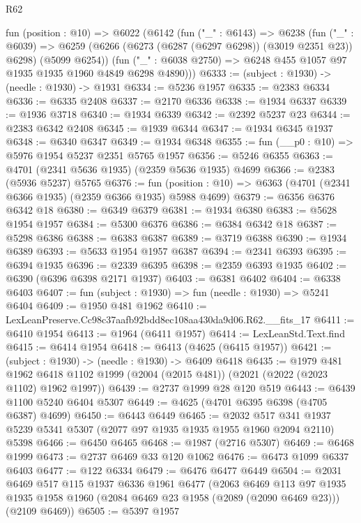 \begin{lexlean}{R62}
\begin{coremodule}
  fun (position : @10) =>
  @6022
    (@6142
      (fun ("_" : @6143) =>
      @6238
        (fun ("_" : @6039) =>
        @6259 (@6266 (@6273 (@6287 (@6297 @6298)) (@3019 @2351 @23)) @6298) (@5099 @6254))
        (fun ("_" : @6038 @2750) => @6248 @455 @1057 @97 @1935 @1935 @1960 @4849 @6298 @4890)))
@6333 := (subject : @1930) -> (needle : @1930) -> @1931
@6334 := @5236 @1957
@6335 := @2383 @6334
@6336 := @6335 @2408
@6337 := @2170 @6336
@6338 := @1934 @6337
@6339 := @1936 @3718
@6340 := @1934 @6339
@6342 := @2392 @5237 @23
@6344 := @2383 @6342 @2408
@6345 := @1939 @6344
@6347 := @1934 @6345 @1937
@6348 := @6340 @6347
@6349 := @1934 @6348
@6355 := fun (__p0 : @10) => @5976 @1954 @5237 @2351 @5765 @1957
@6356 := @5246 @6355
@6363 := @4701 (@2341 @5636 @1935) (@2359 @5636 @1935) @4699
@6366 := @2383 (@5936 @5237) @5765
@6376 := fun (position : @10) => @6363 (@4701 (@2341 @6366 @1935) (@2359 @6366 @1935) @5988 @4699)
@6379 := @6356 @6376 @6342 @18
@6380 := @6349 @6379
@6381 := @1934 @6380
@6383 := @5628 @1954 @1957
@6384 := @5300 @6376
@6386 := @6384 @6342 @18
@6387 := @5298 @6386
@6388 := @6383 @6387
@6389 := @3719 @6388
@6390 := @1934 @6389
@6393 := @5633 @1954 @1957 @6387
@6394 := @2341 @6393
@6395 := @6394 @1935
@6396 := @2339 @6395
@6398 := @2359 @6393 @1935
@6402 := @6390 (@6396 @6398 @2171 @1937)
@6403 := @6381 @6402
@6404 := @6338 @6403
@6407 := fun (subject : @1930) => fun (needle : @1930) => @5241 @6404
@6409 := @1950 @481 @1962
@6410 := LexLeanPreserve.Cc98c37aafb92bdd8ec108aa430da9d06.R62.__fits_17
@6411 := @6410 @1954
@6413 := @1964 (@6411 @1957)
@6414 := LexLeanStd.Text.find
@6415 := @6414 @1954
@6418 := @6413 (@4625 (@6415 @1957))
@6421 := (subject : @1930) -> (needle : @1930) -> @6409 @6418
@6435 := @1979
    @481
    @1962
    @6418
    @1102
    @1999
    (@2004 (@2015 @481))
    (@2021 (@2022 (@2023 @1102) @1962 @1997))
@6439 := @2737 @1999 @28 @120 @519
@6443 := @6439 @1100 @5240 @6404 @5307
@6449 := @4625 (@4701 @6395 @6398 (@4705 @6387) @4699)
@6450 := @6443 @6449
@6465 := @2032
    @517
    @341
    @1937
    @5239
    @5341
    @5307
    (@2077 @97 @1935 @1935 @1955 @1960 @2094 @2110)
    @5398
@6466 := @6450 @6465
@6468 := @1987 (@2716 @5307)
@6469 := @6468 @1999
@6473 := @2737 @6469 @33 @120 @1062
@6476 := @6473 @1099 @6337 @6403
@6477 := @122 @6334
@6479 := @6476 @6477 @6449
@6504 := @2031
    @6469
    @517
    @115
    @1937
    @6336
    @1961
    @6477
    (@2063
      @6469
      @113
      @97
      @1935
      @1935
      @1958
      @1960
      (@2084 @6469 @23 @1958 (@2089 (@2090 @6469 @23)))
      (@2109 @6469))
@6505 := @5397 @1957

\end{coremodule}
\end{lexlean}
